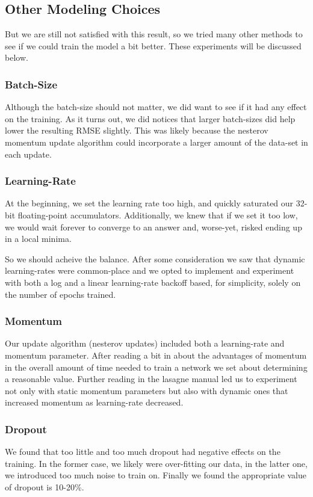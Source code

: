 \documentclass{article}
\begin{document}


\subsection{Other Modeling Choices}

But we are still not satisfied with this result, so we tried many other methods to see if we could train the model a bit better. These experiments will be discussed below.

\subsubsection{Batch-Size}
Although the batch-size should not matter, we did want to see if it had any effect on the training. As it turns out, we did notices that larger batch-sizes did help lower the resulting RMSE slightly. This was likely because the nesterov momentum update algorithm could incorporate a larger amount of the data-set in each update.

\subsubsection{Learning-Rate}
At the beginning, we set the learning rate too high, and quickly saturated our 32-bit floating-point accumulators. Additionally, we knew that if we set it too low, we would wait forever to converge to an answer and, worse-yet, risked ending up in a local minima.

So we should acheive the balance. After some consideration we saw that dynamic learning-rates were common-place \cite[gorr,dnouri]{} and we opted to implement and experiment with both a log and a linear learning-rate backoff based, for simplicity, solely on the number of epochs trained.


\subsubsection{Momentum}
Our update algorithm (nesterov updates) included both a learning-rate and momentum parameter.  After reading a bit in \cite[gorr]{} about the advantages of momentum in the overall amount of time needed to train a network we set about determining a reasonable value.  Further reading in the lasagne manual \cite[lasagnenesterov]{} led us to experiment not only with static momentum parameters but also with dynamic ones that increased momentum as learning-rate decreased.

\subsubsection{Dropout}
We found that too little and too much dropout had negative effects on the training. In the former case, we likely were over-fitting our data, in the latter one, we introduced too much noise to train on. Finally we found the appropriate value of dropout is 10-20\%.
\end{document}
